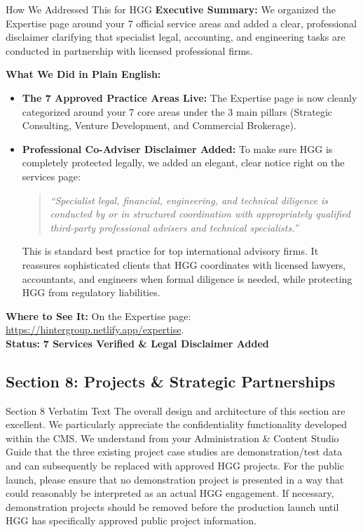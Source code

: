 \documentclass[11pt,a4paper]{article}
\begin{document}
\begin{DetailedResolutionBox}{How We Addressed This for HGG}
\textbf{Executive Summary:} We organized the Expertise page around your 7 official service areas and added a clear, professional disclaimer clarifying that specialist legal, accounting, and engineering tasks are conducted in partnership with licensed professional firms.

\textbf{What We Did in Plain English:}
\begin{itemize}
    \item \textbf{The 7 Approved Practice Areas Live:} The Expertise page is now cleanly categorized around your 7 core areas under the 3 main pillars (Strategic Consulting, Venture Development, and Commercial Brokerage).
    \item \textbf{Professional Co-Adviser Disclaimer Added:} To make sure HGG is completely protected legally, we added an elegant, clear notice right on the services page:
    \begin{quote}
    \textit{``Specialist legal, financial, engineering, and technical diligence is conducted by or in structured coordination with appropriately qualified third-party professional advisers and technical specialists.''}
    \end{quote}
    This is standard best practice for top international advisory firms. It reassures sophisticated clients that HGG coordinates with licensed lawyers, accountants, and engineers when formal diligence is needed, while protecting HGG from regulatory liabilities.
\end{itemize}

\textbf{Where to See It:} On the Expertise page: \url{https://hintergroup.netlify.app/expertise}. \\
\textbf{Status:} \textcolor{HGGGreen}{\textbf{7 Services Verified \& Legal Disclaimer Added}}
\end{DetailedResolutionBox}

\vspace{0.3cm}

\subsection{Section 8: Projects \& Strategic Partnerships}

\begin{VerbatimClientBox}{Section 8 Verbatim Text}
The overall design and architecture of this section are excellent.
We particularly appreciate the confidentiality functionality developed within the CMS.
We understand from your Administration \& Content Studio Guide that the three existing project case studies are demonstration/test data and can subsequently be replaced with approved HGG projects.
For the public launch, please ensure that no demonstration project is presented in a way that could reasonably be interpreted as an actual HGG engagement.
If necessary, demonstration projects should be removed before the production launch until HGG has specifically approved public project information.
\end{VerbatimClientBox}
\end{document}
